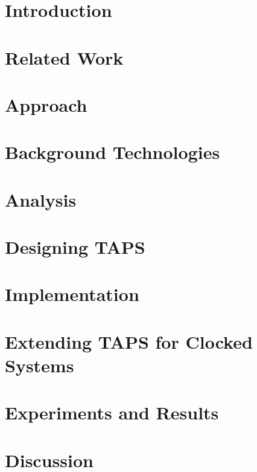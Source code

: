 \documentclass[a4paper]{report}
\begin{document}
\newpage
\tableofcontents

\newpage
{}


\chapter{Introduction}


\chapter{Related Work}
\label{chap:related_work}

%
\chapter{Approach}

%
\chapter{Background Technologies}
\label{chap:background}

%
\chapter{Analysis}
\label{chap:analysis}

%
\chapter{Designing TAPS}
\label{chap:design}


\chapter{Implementation}
\label{chap:implementation}

%
\chapter{Extending TAPS for Clocked Systems}
\label{chap:clock}

%
\chapter{Experiments and Results}
\label{chap:exp}

%
\chapter{Discussion}
\label{chap:discussion}

%
\end{document}
